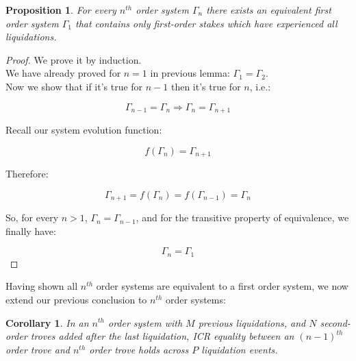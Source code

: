 \documentclass[reqno]{article}
\newtheorem{corollary}{Corollary}[theorem]
\newtheorem{proposition}[theorem]{Proposition}
\begin{document}
\begin{proposition} \label{result:6}
  For every $n^{th}$ order system $\Gamma_n$ there exists an equivalent first order system $\Gamma_1$ that contains only first-order stakes which have experienced all liquidations.
\end{proposition}

\begin{proof}
  We prove it by induction.\\
  We have already proved for $n=1$ in previous lemma: $\Gamma_1=\Gamma_2$.\\
  Now we show that if it’s true for $n-1$ then it’s true for $n$, i.e.:

\begin{equation}
    \Gamma_{n-1} = \Gamma_n \Rightarrow \Gamma_n = \Gamma_{n+1}
\end{equation}

Recall our system evolution function: 

\begin{equation} 
    f(\Gamma_n)=\Gamma_{n+1}
\end{equation}

Therefore:

\begin{equation} 
    \Gamma_{n+1} = f(\Gamma_n) = f(\Gamma_{n-1}) = \Gamma_n
\end{equation}

\bigskip
So, for every $n > 1$, $\Gamma_n = \Gamma_{n-1}$, and for the transitive property of equivalence, we finally have:

\begin{equation}
    \Gamma_n=\Gamma_1
\end{equation}
\end{proof}

\bigskip
Having shown all $n^{th}$ order systems are equivalent to a first order system, we now extend our previous conclusion to $n^{th}$ order systems:

\begin{corollary} \label{result:7}
  In an $n^{th}$ order system with $M$ previous liquidations, and $N$ second-order troves added after the last liquidation, ICR equality between an $(n-1)^{th}$ order trove and $n^{th}$ order trove holds across $P$ liquidation events.
\end{corollary}
\end{document}
